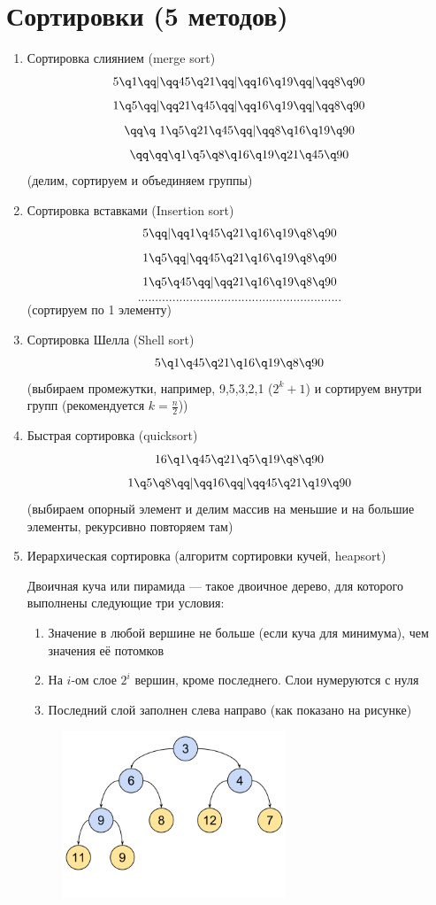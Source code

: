\documentclass[discrete.tex]{subfiles}
\begin{document}
  \section{Сортировки (5 методов)}

  \begin{enumerate}
    \item Сортировка слиянием (merge sort)
    \[5 \q 1 \qq | \qq 45 \q 21 \qq | \qq  16 \q 19 \qq | \qq 8 \q 90\]
    \[1 \q 5 \qq | \qq 21 \q 45 \qq | \qq  16 \q 19 \qq | \qq 8 \q 90\]
    \[\qq \q \ 1 \q 5 \q 21 \q 45 \qq | \qq  8 \q 16 \q 19 \q 90\]
    \[\qq \qq \q 1 \q 5 \q 8 \q 16 \q 19 \q 21 \q 45 \q 90\]
    (делим, сортируем и объединяем группы)
    \item Сортировка вставками (Insertion sort)
    \[5 \qq | \qq 1 \q 45 \q 21 \q 16 \q 19 \q 8 \q 90\]
    \[1 \q 5 \qq | \qq 45 \q 21 \q 16 \q 19 \q 8 \q 90\]
    \[1 \q 5 \q 45 \qq | \qq 21 \q 16 \q 19 \q 8 \q 90\]
    \[...........................................................\]
    (сортируем по 1 элементу)
    \item Сортировка Шелла (Shell sort)
    \[5 \q 1 \q 45 \q 21 \q 16 \q 19 \q 8 \q 90\]
    (выбираем промежутки, например, 9,5,3,2,1 ($2^k + 1$) и сортируем внутри групп (рекомендуется $k = \frac{n}{2}$))
    \item Быстрая сортировка (quicksort)
    \[16 \q 1 \q 45 \q 21 \q 5 \q 19 \q 8 \q 90\]
    \[1 \q 5 \q 8 \qq | \qq 16 \qq | \qq 45 \q 21 \q 19 \q 90\]
    (выбираем опорный элемент и делим массив на меньшие и на большие элементы, рекурсивно повторяем там)
    \item Иерархическая сортировка (алгоритм сортировки кучей, heapsort)
    \begin{definition}
      Двоичная куча или пирамида — такое двоичное дерево, для которого выполнены следующие три условия:
      \begin{enumerate}
        \item Значение в любой вершине не больше (если куча для минимума), чем значения её потомков
        \item На $i$-ом слое $2^i$ вершин, кроме последнего. Слои нумеруются с нуля
        \item Последний слой заполнен слева направо (как показано на рисунке)
      \end{enumerate}

      \begin{figure}[H]
          \includegraphics[height=5cm]{pics/30_1.png}
          \centering
      \end{figure}


\end{definition}
\end{enumerate}
\end{document}
